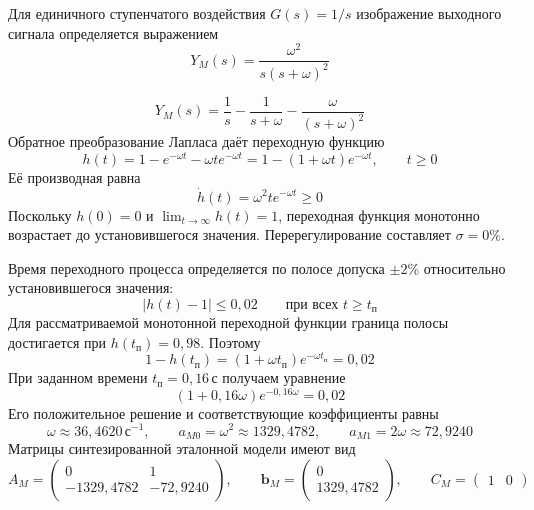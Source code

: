 Для единичного ступенчатого воздействия $G(s)=1/s$ изображение выходного
сигнала определяется выражением
\begin{equation}
  Y_M(s)=\frac{\omega^2}{s(s+\omega)^2}
\end{equation}

\begin{equation}
  Y_M(s)=\frac{1}{s}-\frac{1}{s+\omega}
  -\frac{\omega}{(s+\omega)^2}
\end{equation}
Обратное преобразование Лапласа даёт переходную функцию
\begin{equation}
  h(t)=1-e^{-\omega t}-\omega t e^{-\omega t}
  =1-(1+\omega t)e^{-\omega t},
  \qquad t\ge0
\end{equation}
Её производная равна
\begin{equation}
  \dot h(t)=\omega^2t e^{-\omega t}\ge0
\end{equation}
Поскольку $h(0)=0$ и $\lim_{t\to\infty}h(t)=1$, переходная функция
монотонно возрастает до установившегося значения. Перерегулирование
составляет $\sigma=0\%$.

Время переходного процесса определяется по полосе допуска $\pm2\%$
относительно установившегося значения:
\begin{equation}
  |h(t)-1|\le0{,}02
  \qquad \text{при всех }t\ge t_{\text{п}}
\end{equation}
Для рассматриваемой монотонной переходной функции граница полосы
достигается при $h(t_{\text{п}})=0{,}98$. Поэтому
\begin{equation}
  1-h(t_{\text{п}})
  =(1+\omega t_{\text{п}})e^{-\omega t_{\text{п}}}
  =0{,}02
\end{equation}
При заданном времени $t_{\text{п}}=0{,}16\,\text{с}$ получаем уравнение
\begin{equation}
  (1+0{,}16\omega)e^{-0{,}16\omega}=0{,}02
\end{equation}
Его положительное решение и соответствующие коэффициенты равны
\begin{equation}
  \omega\approx36{,}4620\,\text{с}^{-1},
  \qquad a_{M0}=\omega^2\approx1329{,}4782,
  \qquad a_{M1}=2\omega\approx72{,}9240
\end{equation}
Матрицы синтезированной эталонной модели имеют вид
\begin{equation}
  A_M=\begin{pmatrix}
    0&1\\
    -1329{,}4782&-72{,}9240
  \end{pmatrix},
  \qquad
  \bm b_M=\begin{pmatrix}
    0\\
    1329{,}4782
  \end{pmatrix},
  \qquad C_M=\begin{pmatrix}1&0\end{pmatrix}
\end{equation}


